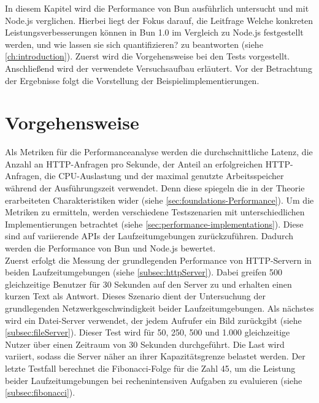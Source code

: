  \label{ch:performanceAnalysis}
In diesem Kapitel wird die Performance von Bun ausführlich untersucht und mit Node.js verglichen. Hierbei liegt der Fokus darauf, die Leitfrage \glqq Welche konkreten Leistungsverbesserungen können in Bun 1.0 im Vergleich zu Node.js festgestellt werden, und wie lassen sie sich quantifizieren?\grqq{} zu beantworten (siehe \autoref{ch:introduction}). Zuerst wird die Vorgehensweise bei den Tests vorgestellt. Anschließend wird der verwendete Versuchsaufbau erläutert. Vor der Betrachtung der Ergebnisse folgt die Vorstellung der Beispielimplementierungen.


\section{Vorgehensweise} \label{sec:performance-approach}
Als Metriken für die Performanceanalyse werden die durchschnittliche Latenz, die Anzahl an HTTP-Anfragen pro Sekunde, der Anteil an erfolgreichen HTTP-Anfragen, die CPU-Auslastung und der maximal genutzte Arbeitsspeicher während der Ausführungszeit verwendet. Denn diese spiegeln die in der Theorie erarbeiteten Charakteristiken wider (siehe \autoref{sec:foundations-Performance}). Um die Metriken zu ermitteln, werden verschiedene Testszenarien mit unterschiedlichen Implementierungen betrachtet (siehe \autoref{sec:performance-implementations}). Diese sind auf variierende APIs der Laufzeitumgebungen zurückzuführen. Dadurch werden die Performance von Bun und Node.js bewertet.\\

\noindent
Zuerst erfolgt die Messung der grundlegenden Performance von HTTP-Servern in beiden Laufzeitumgebungen (siehe \autoref{subsec:httpServer}). Dabei greifen 500 gleichzeitige Benutzer für 30 Sekunden auf den Server zu und erhalten einen kurzen Text als Antwort. Dieses Szenario dient der Untersuchung der grundlegenden Netzwerkgeschwindigkeit beider Laufzeitumgebungen. Als nächstes wird ein Datei-Server verwendet, der jedem Aufrufer ein Bild zurückgibt (siehe \autoref{subsec:fileServer}). Dieser Test wird für 50, 250, 500 und 1.000 gleichzeitige Nutzer über einen Zeitraum von 30 Sekunden durchgeführt. Die Last wird variiert, sodass die Server näher an ihrer Kapazitätsgrenze belastet werden. Der letzte Testfall berechnet die Fibonacci-Folge für die Zahl 45, um die Leistung beider Laufzeitumgebungen bei rechenintensiven Aufgaben zu evaluieren (siehe \autoref{subsec:fibonacci}).

